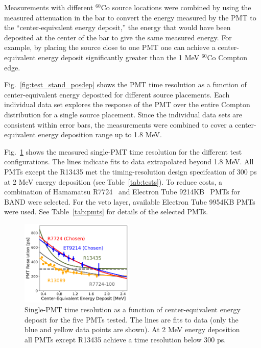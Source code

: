 \documentclass[3p,twocolumn]{elsarticle}
\begin{document}
Measurements with different $^{60}$Co
source locations were combined by using the measured attenuation in the bar to convert
the energy measured by the PMT to the ``center-equivalent energy
deposit,'' the energy that would have been deposited at the center of
the bar to give the same measured energy.  For example, by placing the
source close to one PMT one can achieve a center-equivalent energy
deposit significantly greater than the 1 \si{\mega\electronvolt} $^{60}$Co Compton edge.

Fig.~\ref{fig:test_stand_posdep} shows the PMT time resolution as a
function of center-equivalent energy deposited for different source placements. Each individual data set explores the response of the PMT over the entire Compton distribution for a single source placement. Since the individual data sets are consistent within error bars,
the measurements were combined to cover a center-equivalent energy deposition range
up to 1.8 \si{\mega\electronvolt}.



Fig.~\ref{fig:test_stand_results} shows the measured single-PMT time
resolution for the different test configurations.  The lines indicate fits
to data extrapolated beyond 1.8 \si{\mega\electronvolt}.  
All PMTs except the R13435 met the timing-resolution design specifcation of 300 \si{\pico\s} at 2
\si{\mega\electronvolt} energy deposition (see 
Table~\ref{tab:tests}).  To reduce costs, a combination of
Hamamatsu R7724~\cite{pmtR7724} and Electron Tube 9214KB~\cite{pmt9214} PMTs for BAND were selected. For the veto layer,  
available Electron Tube 9954KB PMTs were used. See Table~\ref{tab:pmts} for
details of the selected PMTs.

\begin{figure}[tb]
	\centering
		\includegraphics[width=0.48\textwidth]{fig6-pmt-res.pdf}
		\caption{Single-PMT time resolution as a function of center-equivalent energy deposit for the five PMTs
                  tested. The lines are fits to data (only the blue  and yellow data points are shown). At 2
                  \si{\mega\electronvolt} energy deposition all PMTs except R13435 achieve a time resolution below 300 \si{\pico\s}.}
          	\label{fig:test_stand_results}
\end{figure}
\end{document}

